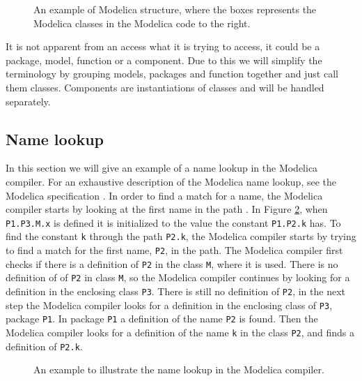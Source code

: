 \documentclass{cslthse-msc}
\begin{document}
\begin{figure}[!htbp]
    \centering
    \qquad
    \subfloat{\raisebox{3.2 cm}{}}
    \caption{An example of Modelica structure, where the boxes represents the Modelica classes in the Modelica code to the right.}
    \label{fig:modelicaExample}
\end{figure}

It is not apparent from an access what it is trying to access, it could be a package, model, function or a component. Due to this we will simplify the terminology by grouping models, packages and function together and just call them classes. Components are instantiations of classes and will be handled separately.

\subsection{Name lookup}
In this section we will give an example of a name lookup in the Modelica compiler. For an exhaustive description of the Modelica name lookup, see the Modelica specification \cite{modelicamodelica}. In order to find a match for a name, the Modelica compiler starts by looking at the first name in the path \cite{modelicamodelica, tillermodelica}. In Figure \ref{fig:nameLookup}, when \texttt{P1.P3.M.x} is defined it is initialized to the value the constant \texttt{P1.P2.k} has. To find the constant \texttt{k} through the path \texttt{P2.k}, the Modelica compiler starts by trying to find a match for the first name, \texttt{P2}, in the path. The Modelica compiler first checks if there is a definition of \texttt{P2} in the class \texttt{M}, where it is used. There is no definition of of \texttt{P2} in class \texttt{M}, so the Modelica compiler continues by looking for a definition in the enclosing class \texttt{P3}. There is still no definition of \texttt{P2}, in the next step the Modelica compiler looks for a definition in the enclosing class of \texttt{P3}, package \texttt{P1}. In package \texttt{P1} a definition of the name \texttt{P2} is found. Then the Modelica compiler looks for a definition of the name \texttt{k} in the class \texttt{P2}, and finds a definition of \texttt{P2.k}.

\begin{figure}[!htbp]
    \centering
    
    \caption{An example to illustrate the name lookup in the Modelica compiler.}
    \label{fig:nameLookup}
\end{figure}
\end{document}

